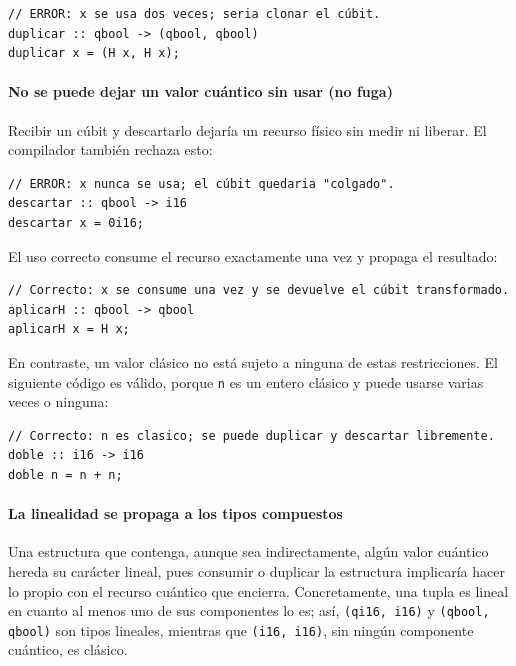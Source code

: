 \begin{lstlisting}[language={}, caption=Violación de no clonación por uso doble de un valor cuántico]
// ERROR: x se usa dos veces; seria clonar el cúbit.
duplicar :: qbool -> (qbool, qbool)
duplicar x = (H x, H x);
\end{lstlisting}

\paragraph{No se puede dejar un valor cuántico sin usar (no fuga)}
Recibir un cúbit y descartarlo dejaría un recurso físico sin medir ni liberar. El compilador también rechaza esto:

\begin{lstlisting}[language={}, caption=Violación de no fuga por descarte implícito de un cúbit]
// ERROR: x nunca se usa; el cúbit quedaria "colgado".
descartar :: qbool -> i16
descartar x = 0i16;
\end{lstlisting}

El uso correcto consume el recurso exactamente una vez y propaga el resultado:

\begin{lstlisting}[language={}, caption=Uso correcto de un valor cuántico lineal]
// Correcto: x se consume una vez y se devuelve el cúbit transformado.
aplicarH :: qbool -> qbool
aplicarH x = H x;
\end{lstlisting}

En contraste, un valor clásico no está sujeto a ninguna de estas restricciones. El siguiente código es válido, porque \lstinline|n| es un entero clásico y puede usarse varias veces o ninguna:

\begin{lstlisting}[language={}, caption=Valor clásico sin restricciones de linealidad]
// Correcto: n es clasico; se puede duplicar y descartar libremente.
doble :: i16 -> i16
doble n = n + n;
\end{lstlisting}

\paragraph{La linealidad se propaga a los tipos compuestos}
Una estructura que contenga, aunque sea indirectamente, algún valor cuántico hereda su carácter lineal, pues consumir o duplicar la estructura implicaría hacer lo propio con el recurso cuántico que encierra. Concretamente, una tupla es lineal en cuanto al menos uno de sus componentes lo es; así, \lstinline|(qi16, i16)| y \lstinline|(qbool, qbool)| son tipos lineales, mientras que \lstinline|(i16, i16)|, sin ningún componente cuántico, es clásico.

